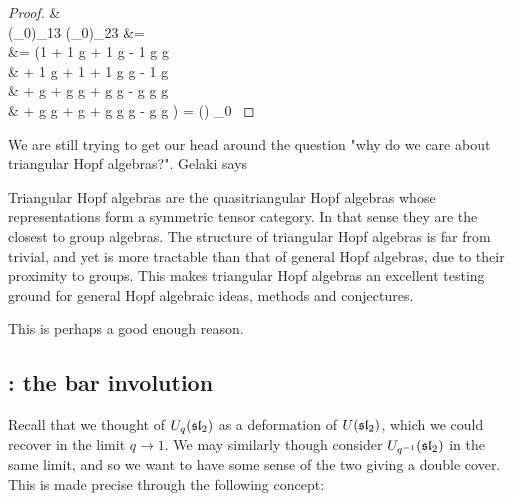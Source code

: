 \documentclass{article}
\begin{document}
\begin{proof}
{&\phantom{=} \\
(_0)_{13} (_0)_{23} &=   \\
&= (1   + 1  \otimes g + 1 \otimes g  - 1 \otimes g \otimes g \\
&\phantom{=} + 1  \otimes g + 1   + 1 \otimes g \otimes g - 1 \otimes g  \\
&\phantom{=} + g   + g  \otimes g + g \otimes g  - g \otimes g \otimes g \\
&\phantom{=} + g  \otimes g + g   + g \otimes g \otimes g - g \otimes g  ) = (\Delta {}) _0 \quad {}
}
\end{proof}

\begin{idea}
We are still trying to get our head around the question "why do we care about triangular Hopf algebras?". Gelaki \cite{Gelaki200} says 
\begin{displayquote}
Triangular Hopf algebras are the quasitriangular Hopf algebras whose representations
form a symmetric tensor category. In that sense they are the closest to
group algebras. The structure of triangular Hopf algebras is far from trivial, and yet is more tractable than that of general Hopf algebras, due to
their proximity to groups. This makes triangular Hopf algebras an excellent testing ground for general Hopf algebraic ideas, methods and conjectures.
\end{displayquote}
This is perhaps a good enough reason. 
\end{idea}

\subsection{: the bar involution}

Recall that we thought of $U_q(\mathfrak{sl}_2)$ as a deformation of $U(\mathfrak{sl}_2)$, which we could recover in the limit $q \to 1$. We may similarly though consider $U_{q^{-1}}(\mathfrak{sl}_2)$ in the same limit, and so we want to have some sense of the two giving a double cover. This is made precise through the following concept:
\end{document}

